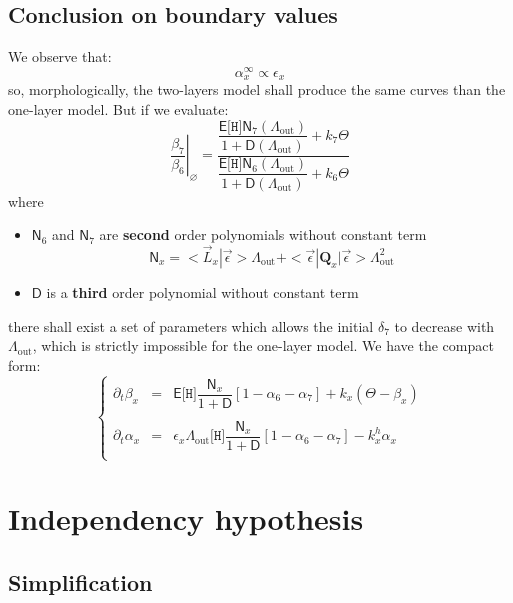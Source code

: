 \documentclass[aps,onecolumn,11pt]{revtex4}
\newcommand{\mychem}[1]{\mathtt{#1}}
\newcommand{\myconc}[1]{\big[#1\big]}
\newcommand{\spproton}{\mychem{H}}
\newcommand{\proton}{\myconc{\spproton}}
\newcommand{\myout}[1]{{#1}_{\mathrm{out}}}
\newcommand{\mymat}[1]{{\bm{#1}}}
\newcommand{\LiAll}{\Lambda}
\newcommand{\LiAllOut}{\myout{\LiAll}}
\begin{document}
\subsection{Conclusion on boundary values}
We observe that:
\begin{equation}
\alpha_x^\infty \propto \epsilon_x
\end{equation}
so, morphologically, the two-layers model shall produce the same curves than the one-layer model.
But if we evaluate:
\begin{equation}
	\left.\dfrac{\beta_7}{\beta_6}\right\vert_\varnothing = 
	\dfrac{ \dfrac{\mathsf{E}\proton\mathsf{N}_7(\LiAllOut)}{1+\mathsf{D}(\LiAllOut)}+k_7 \Theta}
	{  \dfrac{\mathsf{E}\proton\mathsf{N}_6(\LiAllOut)}{1+\mathsf{D}(\LiAllOut)} +k_6 \Theta}
\end{equation}
where
\begin{itemize}
\item ${\mathsf{N}_6}$ and  ${\mathsf{N}_7}$ are  {\bf second} order polynomials without constant term
\begin{equation}
\mathsf{N}_x = <\vec{L}_x|\vec{\epsilon}> \LiAllOut + <\vec{\epsilon}|\mymat{Q}_x|\vec{\epsilon}>\LiAllOut^2
\end{equation}
\item ${\mathsf{D}}$ is a {\bf third } order polynomial without constant term
\end{itemize}
there shall exist a set of parameters which allows the initial $\delta_7$ to decrease with $\LiAllOut$, which is
strictly impossible for the one-layer model.
We have the compact form:
\begin{equation}
\boxed{
\left\lbrace
\begin{array}{rcl}
	\partial_t \beta_x  & = & \mathsf{E}\proton \dfrac{\mathsf{N}_x}{1+\mathsf{D}} \left[ 1-\alpha_6-\alpha_7\right] + k_x \left(\Theta-\beta_x\right)\\
	\\
	\partial_t \alpha_x & = & \epsilon_x \LiAllOut \proton \dfrac{\mathsf{N}_x}{1+\mathsf{D}} \left[ 1-\alpha_6-\alpha_7\right] - k^h_x \alpha_x \\
\end{array}
\right.
}
\end{equation}

\section{Independency hypothesis}
\subsection{Simplification}
\end{document}
